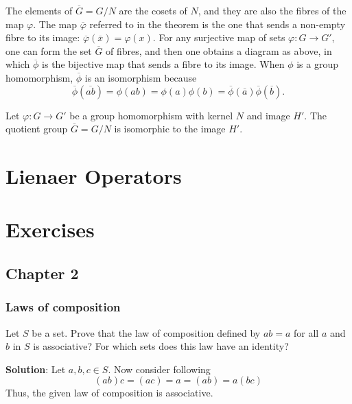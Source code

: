 \documentclass[
]{book}
\begin{document}
The elements of \(\overline{G}=G/N\) are the cosets of \(N\), and they
are also the fibres of the map \(\varphi\). The map
\(\overline{\varphi}\) referred to in the theorem is the one that sends
a non-empty fibre to its image:
\(\overline{\varphi}(\overline{x})=\varphi(x)\). For any surjective map
of sets \(\varphi: G \to G'\), one can form the set \(\overline{G}\) of
fibres, and then one obtains a diagram as above, in which
\(\overline{\phi}\) is the bijective map that sends a fibre to its
image. When \(\phi\) is a group homomorphism, \(\overline{\phi}\) is an
isomorphism because
\[\overline{\phi}(\overline{ab}) = \phi(ab) = \phi(a)\phi(b) = \overline{\phi}(\overline{a})\overline{\phi}(\overline{b}).\]

\hfill\break

\leavevmode{}%
Let \(\varphi: G \rightarrow G'\) be a group homomorphism with kernel
\(N\) and image \(H'\). The quotient group \(\overline{G}=G/N\) is
isomorphic to the image \(H'\).

\hypertarget{lienaer-operators}{%
\chapter{Lienaer Operators}\label{lienaer-operators}}

\hypertarget{exercises}{%
\chapter{Exercises}\label{exercises}}

\hypertarget{chapter-2}{%
\section{Chapter 2}\label{chapter-2}}

\hypertarget{laws-of-composition}{%
\subsection{Laws of composition}\label{laws-of-composition}}

\leavevmode{}%
Let \(S\) be a set. Prove that the law of composition defined by
\(ab = a\) for all \(a\) and \(b\) in \(S\) is associative? For which
sets does this law have an identity?

\textbf{Solution}: Let \(a,b,c\in S\). Now consider following
\[(ab)c=(ac)=a=(ab)=a(bc)\] Thus, the given law of composition is
associative.
\end{document}
